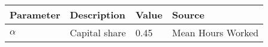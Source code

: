 \begin{tabular}{l l l l} 
\hline 
Parameter & Description & Value & Source \\ 
\hline 
$\alpha$ & Capital share & 0.45 & Mean Hours Worked \\ 
\hline 
\end{tabular}
